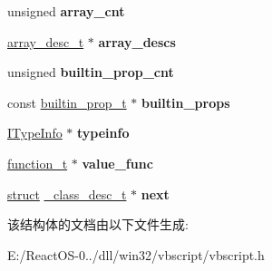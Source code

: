 \begin{DoxyCompactItemize}
\item 
\mbox{\label{struct__class__desc__t_af4a1876cef7fe436ddd1c6ac79b17890}} 
unsigned {\bfseries array\+\_\+cnt}
\item 
\mbox{\label{struct__class__desc__t_a0e28f91fbb01b075aee202da4ecb9301}} 
\hyperlink{structarray__desc__t}{array\+\_\+desc\+\_\+t} $\ast$ {\bfseries array\+\_\+descs}
\item 
\mbox{\label{struct__class__desc__t_a8886a03d985f0401abcbb495fd0cd7c6}} 
unsigned {\bfseries builtin\+\_\+prop\+\_\+cnt}
\item 
\mbox{\label{struct__class__desc__t_a55b59ab06b86facb616ac2f3aaa6f953}} 
const \hyperlink{structbuiltin__prop__t}{builtin\+\_\+prop\+\_\+t} $\ast$ {\bfseries builtin\+\_\+props}
\item 
\mbox{\label{struct__class__desc__t_a6c47482da9c2f02b51c8018737d83aea}} 
\hyperlink{interface_i_type_info}{I\+Type\+Info} $\ast$ {\bfseries typeinfo}
\item 
\mbox{\label{struct__class__desc__t_afdeffaaa55af4d8795a8b13b2a68e73c}} 
\hyperlink{struct__function__t}{function\+\_\+t} $\ast$ {\bfseries value\+\_\+func}
\item 
\mbox{\label{struct__class__desc__t_ab4d0b473eccc8d3914c834f767daab59}} 
\hyperlink{interfacestruct}{struct} \hyperlink{struct__class__desc__t}{\+\_\+class\+\_\+desc\+\_\+t} $\ast$ {\bfseries next}
\end{DoxyCompactItemize}


该结构体的文档由以下文件生成\+:\begin{DoxyCompactItemize}
\item 
E\+:/\+React\+O\+S-\/0../dll/win32/vbscript/vbscript.\+h\end{DoxyCompactItemize}
